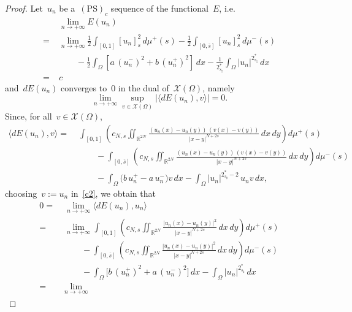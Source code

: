\documentclass[10pt,a4paper]{amsart}
\newcommand{\PS}[1]{$(\text{PS})_{#1}$}
\def \R {\mathbb{R}}
\newcommand{\half}{\frac{1}{2}}
\begin{document}
\begin{proof}
Let~$u_n$ be a~\PS{c} sequence of the functional~$E$, i.e.
\begin{equation}\label{c1}
\begin{split}&
\lim_{n\to+\infty}
E(u_n) \\
= \;&\lim_{n\to+\infty}\half  \int_{[{{ 0 }}, 1]} [u_n]^2_{s}\, d\mu^+ (s)
-\half\int_{[{{ 0 }}, \overline s]} [u_n]^2_s \, d\mu^-(s)
\\&\qquad - \half \int_\Omega \left[a\, (u_n^-)^2 + b\, (u_n^+)^2\right] \,dx - \frac{1}{2_{s_\sharp}^*} \int_\Omega |u_n|^{2_{s_\sharp}^*}\, dx\\= \;&c
\end{split}
\end{equation}
and~$ dE (u_n)$ converges to~$0$ in the dual of~$\mathcal{X}(\Omega)$,
namely
\begin{equation}\label{c2}
\lim_{n\to+\infty}\sup_{ v \in \mathcal{X}(\Omega)}\big|\langle dE (u_n), v\rangle\big| =0.
\end{equation}
Since, for all~$v \in \mathcal{X}(\Omega)$,
\begin{equation*}\begin{split}
\langle dE (u_n), v\rangle =
\;& \int_{[{{ 0 }}, 1]}\left(c_{N,s}
\iint_{\R^{2N}} \frac{(u_n(x) - u_n(y))\, (v(x) - v(y))}{|x - y|^{N+2s}}\, dx\, dy\right) d\mu^+(s)\\
&\qquad- \int_{[{{ 0 }}, \overline s]}\left(c_{N,s}
\iint_{\R^{2N}} \frac{(u_n(x) - u_n(y))\, (v(x) - v(y))}{|x - y|^{N+2s}}\, dx\, dy\right) d\mu^-(s)\\
&\qquad -\int_\Omega \big(b\, u_n^+ -a\, u_n^-\big)v \, dx - \int_\Omega |u_n|^{2_{s_\sharp}^\ast - 2}\, u_n v\, dx,
\end{split}
\end{equation*}
choosing~$v:=u_n$ in~\eqref{c2},
we obtain that
\begin{equation}\label{hufewghwutgui0987654}
\begin{split}0=\;& \lim_{n\to+\infty}
\langle dE (u_n), u_n\rangle\\=
\;& \lim_{n\to+\infty}\int_{[{{ 0 }}, 1]}\left(c_{N,s}
\iint_{\R^{2N}} \frac{|u_n(x) - u_n(y)|^2}{|x - y|^{N+2s}}\, dx\, dy\right) d\mu^+(s)\\
&\qquad- \int_{[{{ 0 }}, \overline s]}\left(c_{N,s}
\iint_{\R^{2N}} \frac{|u_n(x) - u_n(y)|^2}{|x - y|^{N+2s}}\, dx\, dy\right) d\mu^-(s)\\
&\qquad -\int_\Omega \big[b\, (u_n^+)^2 +a\, (u_n^-)^2\big]\, dx - \int_\Omega |u_n|^{2_{s_\sharp}^\ast}\, dx\\=\;&  \lim_{n\to+\infty}

\end{split}
\end{equation}
\end{proof}
\end{document}
